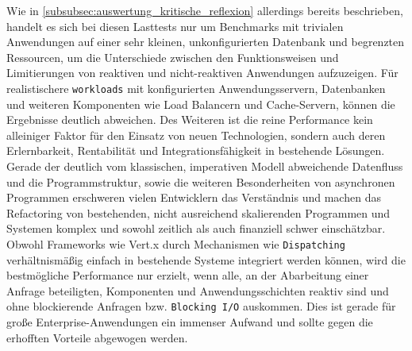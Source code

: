 Wie in \ref{subsubsec:auswertung_kritische_reflexion} allerdings bereits beschrieben, handelt es sich bei diesen Lasttests nur um
Benchmarks mit trivialen Anwendungen auf einer sehr kleinen, unkonfigurierten Datenbank und begrenzten Ressourcen, um
die Unterschiede zwischen den Funktionsweisen und Limitierungen von reaktiven und nicht-reaktiven Anwendungen aufzuzeigen.
Für realistischere \verb|workloads| mit konfigurierten Anwendungsservern, Datenbanken und weiteren Komponenten wie Load Balancern und
Cache-Servern,  können die Ergebnisse deutlich abweichen.
Des Weiteren ist die reine Performance kein alleiniger Faktor für den Einsatz von neuen Technologien, sondern auch deren
Erlernbarkeit, Rentabilität und Integrationsfähigkeit in bestehende Lösungen.
Gerade der deutlich vom klassischen, imperativen Modell abweichende Datenfluss und die Programmstruktur, sowie die weiteren Besonderheiten
von asynchronen Programmen erschweren vielen Entwicklern das Verständnis und machen das Refactoring von bestehenden, nicht ausreichend
skalierenden Programmen und Systemen komplex und sowohl zeitlich als auch finanziell schwer einschätzbar.
Obwohl Frameworks wie Vert.x durch Mechanismen wie \verb|Dispatching| verhältnismäßig einfach in bestehende Systeme integriert werden
können, wird die bestmögliche Performance nur erzielt, wenn alle, an der Abarbeitung einer Anfrage beteiligten, Komponenten und
Anwendungsschichten reaktiv sind und ohne blockierende Anfragen bzw. \verb|Blocking I/O| auskommen. Dies ist gerade für
große Enterprise-Anwendungen ein immenser Aufwand und sollte gegen die erhofften Vorteile abgewogen werden.